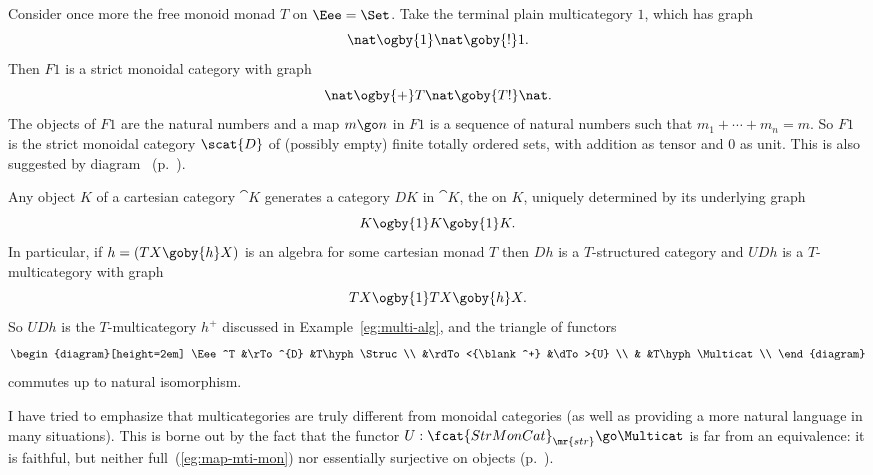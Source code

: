\begin{example}	
Consider once more the free monoid monad $T$ on $\Eee=\Set$.  Take the
terminal plain multicategory $1$, which has graph
\[
\nat \ogby{1} \nat \goby{!} 1.
\]
Then $F1$ is a strict monoidal category with graph
\[
\nat \ogby{+} T\nat \goby{T!} \nat.
\]
The objects of $F1$ are the natural numbers and a map $m \go n$ in $F1$ is
a sequence  of natural numbers such that $m_1 +\cdots+
m_n = m$.  So $F1$ is the strict monoidal category $\scat{D}$%
%
%
of (possibly
empty) finite totally ordered sets, with addition as tensor and $0$ as
unit.  This is also suggested by diagram~
(p.~\pageref{diag:arrows-in-mon-cat}).
\end{example}


\begin{example}	
Any object $K$ of a cartesian category $\cat{K}$ generates a category $DK$%
% 
% 
in $\cat{K}$, the  on $K$, uniquely determined by
its underlying graph
\[
K \ogby{1} K \goby{1} K.
\]
In particular, if $h = (TX \goby{h} X)$ is an algebra for some cartesian
monad $T$ then $Dh$ is a $T$-structured category and $UDh$ is a
$T$-multicategory with graph
\[
TX \ogby{1} TX \goby{h} X.
\]
So $UDh$ is the $T$-multicategory $h^+$%
%
%
discussed in
Example~\ref{eg:multi-alg}, and the triangle of functors
\[
\begin{diagram}[height=2em]
\Eee^T	&\rTo^{D}	&T\hyph\Struc	\\
	&\rdTo<{\blank^+}	&\dTo>{U}	\\
	&			&T\hyph\Multicat\\
\end{diagram}
\]
commutes up to natural isomorphism.  
\end{example}

I have tried to emphasize that multicategories are truly different from
monoidal categories (as well as providing a more natural language in many
situations).  This is borne out by the fact that the functor $U:
\fcat{StrMonCat}_\mr{str} \go \Multicat$ is far from an equivalence: it
is faithful, but neither full~(\ref{eg:map-mti-mon}) nor
essentially surjective on objects (p.~\pageref{p:not-ESO}).  

